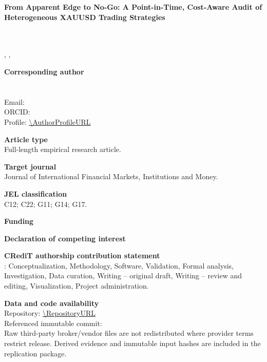 \documentclass[11pt,a4paper]{article}
\begin{document}
\thispagestyle{empty}
\begin{center}
{\Large\bfseries From Apparent Edge to No-Go: A Point-in-Time, Cost-Aware Audit of Heterogeneous XAUUSD Trading Strategies\par}
\vspace{1.5cm}
{\large \AuthorName\par}
{\normalsize \AuthorTitle\par}
\vspace{0.4cm}
\AffiliationOrganization\\
\AffiliationAddress\\
\AffiliationCity, \AffiliationPostcode, \AffiliationCountry
\end{center}

\vspace{1cm}
\textbf{Corresponding author}\\
\AuthorName\\
\AuthorTitle\\
Email: \AuthorEmail\\
\if\relax\detokenize\expandafter{\AuthorORCID}\relax\else ORCID: \AuthorORCID\\\fi
\if\relax\detokenize\expandafter{\AuthorProfileURL}\relax\else Profile: \expandafter\url\expandafter{\AuthorProfileURL}\fi

\textbf{Article type}\\
Full-length empirical research article.

\textbf{Target journal}\\
Journal of International Financial Markets, Institutions and Money.

\textbf{JEL classification}\\
C12; C22; G11; G14; G17.

\textbf{Funding}\\
\FundingStatement

\textbf{Declaration of competing interest}\\
\InterestStatement

\textbf{CRediT authorship contribution statement}\\
\AuthorName: Conceptualization, Methodology, Software, Validation, Formal analysis, Investigation, Data curation, Writing -- original draft, Writing -- review and editing, Visualization, Project administration.

\textbf{Data and code availability}\\
Repository: \expandafter\url\expandafter{\RepositoryURL}\\
Referenced immutable commit: \RepositoryCommit\\
Raw third-party broker/vendor files are not redistributed where provider terms restrict release. Derived evidence and immutable input hashes are included in the replication package.
\end{document}
